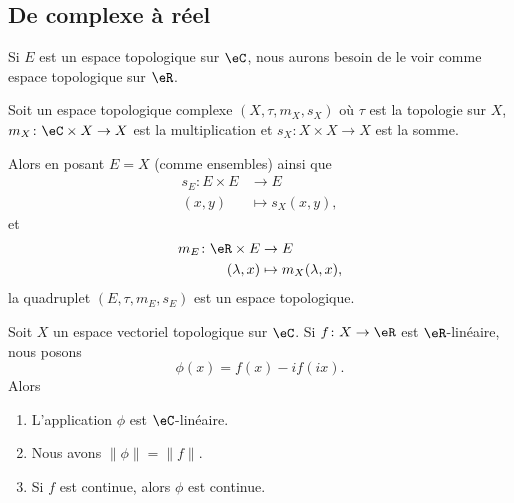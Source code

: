 \subsection{De complexe à réel}

Si \( E\) est un espace topologique sur \( \eC\), nous aurons besoin de le voir comme espace topologique sur \( \eR\).

\begin{proposition}	\label{PROPooAIMVooYtZVJV}
	Soit un espace topologique complexe \( (X,\tau,m_X,s_X)\) où \( \tau\) est la topologie sur \( X\), \(m_X \colon \eC\times X\to X  \) est la multiplication et \(s_X \colon X\times X\to X  \) est la somme.

	Alors en posant \( E=X\) (comme ensembles) ainsi que
	\begin{equation}
		\begin{aligned}
			s_E\colon E\times E & \to E             \\
			(x,y)               & \mapsto s_X(x,y),
		\end{aligned}
	\end{equation}
	et
	\begin{equation}
		\begin{aligned}
			m_E\colon \eR\times E & \to E                   \\
			(\lambda,x)           & \mapsto m_X(\lambda,x),
		\end{aligned}
	\end{equation}
	la quadruplet \( (E,\tau,m_E,s_E)\) est un espace topologique.
\end{proposition}

\begin{proposition}	\label{PROPooQMGXooBnJblx}
	Soit \( X\) un espace vectoriel topologique sur \( \eC\). Si \(f \colon X\to \eR  \) est \( \eR\)-linéaire, nous posons
	\begin{equation}
		\phi(x)=f(x)-if(ix).
	\end{equation}
	Alors
	\begin{enumerate}
		\item
		      L'application \( \phi\) est \( \eC\)-linéaire.
		\item
		      Nous avons \( \| \phi \|=\| f \|\).
		\item
		      Si \( f\) est continue, alors \( \phi\) est continue.
	\end{enumerate}
\end{proposition}


